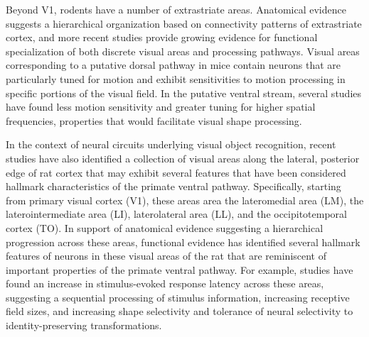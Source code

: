 Beyond V1, rodents have a number of extrastriate areas\cite{Andermann2011, Marshel2011, Juavinett2017,Espinoza1983, Coogan1993}. Anatomical evidence suggests a hierarchical organization based on connectivity patterns of extrastriate cortex\cite{Wang2007, Wang2011}, and more recent studies provide growing evidence for functional specialization of both discrete visual areas and processing pathways\cite{Andermann2011, Marshel2011, Glickfeld2013, Glickfeld2017, Beltramo2019, DeVries2020, Siegle2021, Blot2021}. Visual areas corresponding to a putative dorsal pathway in mice contain neurons that are particularly tuned for motion\cite{Andermann2011, Marshel2011, Glickfeld2013} and exhibit sensitivities to motion processing in specific portions of the visual field\cite{Sit2020}. In the putative ventral stream, several studies have found less motion sensitivity and greater tuning for higher spatial frequencies\cite{Glickfeld2013, Tohmi2014}, properties that would facilitate visual shape processing. 

In the context of neural circuits underlying visual object recognition, recent studies have also identified a collection of visual areas along the lateral, posterior edge of rat cortex that may exhibit several features that have been considered hallmark characteristics of the primate ventral pathway. Specifically, starting from primary visual cortex (V1), these areas area the lateromedial area (LM), the laterointermediate area (LI), laterolateral area (LL), and the occipitotemporal cortex (TO). In support of anatomical evidence suggesting a hierarchical progression across these areas\cite{Coogan1993, Wang2012NetworkCortex, DSouza2020}, functional evidence has identified several hallmark features of neurons in these visual areas of the rat that are reminiscent of important properties of the primate ventral pathway. For example, studies have found an increase in stimulus-evoked response latency across these areas\cite{Vermaercke2014, DSouza2020}, suggesting a sequential processing of stimulus information, increasing receptive field sizes\cite{Vermaercke2014, Tafazoli2017}, and increasing shape selectivity and tolerance of neural selectivity to identity-preserving transformations\cite{Vermaercke2014, Vermaercke2015, Tafazoli2017, Matteucci2019b, Froudarakis2020}.

